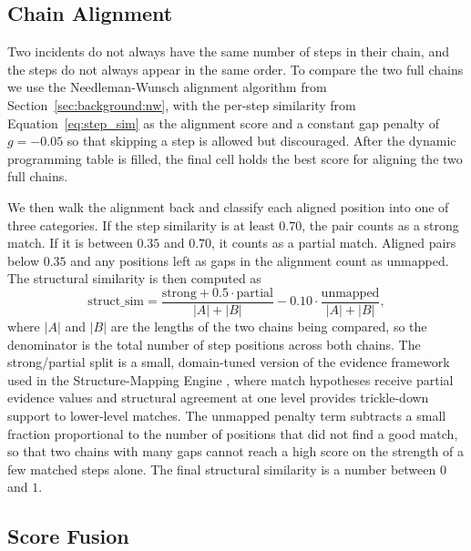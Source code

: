 \documentclass[11pt]{article}
\begin{document}
\subsection{Chain Alignment}
\label{sec:phase3:align}

Two incidents do not always have the same number of steps in their chain, and the steps do not always appear in the same order. To compare the two full chains we use the Needleman-Wunsch alignment algorithm from Section~\ref{sec:background:nw}, with the per-step similarity from Equation~\ref{eq:step_sim} as the alignment score and a constant gap penalty of $g = -0.05$ so that skipping a step is allowed but discouraged. After the dynamic programming table is filled, the final cell holds the best score for aligning the two full chains.

We then walk the alignment back and classify each aligned position into one of three categories. If the step similarity is at least $0.70$, the pair counts as a strong match. If it is between $0.35$ and $0.70$, it counts as a partial match. Aligned pairs below $0.35$ and any positions left as gaps in the alignment count as unmapped. The structural similarity is then computed as
\begin{equation}
\text{struct\_sim} = \frac{\text{strong} + 0.5 \cdot \text{partial}}{|A| + |B|} - 0.10 \cdot \frac{\text{unmapped}}{|A| + |B|},
\label{eq:chain_score}
\end{equation}
where $|A|$ and $|B|$ are the lengths of the two chains being compared, so the denominator is the total number of step positions across both chains. The strong/partial split is a small, domain-tuned version of the evidence framework used in the Structure-Mapping Engine \citep{FalkenhainerForbusGentner1989}, where match hypotheses receive partial evidence values and structural agreement at one level provides trickle-down support to lower-level matches. The unmapped penalty term subtracts a small fraction proportional to the number of positions that did not find a good match, so that two chains with many gaps cannot reach a high score on the strength of a few matched steps alone. The final structural similarity is a number between $0$ and $1$.

\subsection{Score Fusion}
\label{sec:phase3:fusion}
\end{document}

